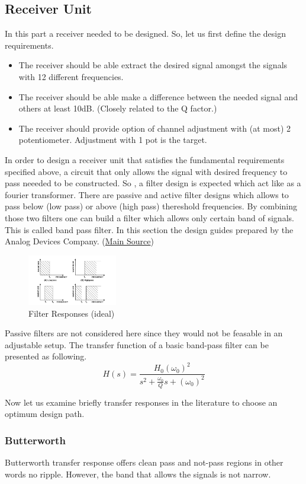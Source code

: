 \documentclass[letterpaper,12pt]{article}
\begin{document}
\subsection{Receiver Unit}
In this part a receiver needed to be designed. So, let us first define the design requirements.
\begin{itemize}
    \item The receiver should be able extract the desired signal amongst the signals with 12 different frequencies.
    \item The receiver should be able make a difference between the needed signal and others at least 10dB. (Closely related to the Q factor.)
    \item The receiver should provide option of channel adjustment with (at most) 2 potentiometer. Adjustment with 1 pot is the target. 
\end{itemize}
In order to design a receiver unit that satisfies the fundamental requirements specified above, a circuit that only allows the signal with desired frequency to pass neeeded to be constructed. So , a filter design is expected which act like as a fourier transformer. There are passive and active filter designs which allows to pass below (low pass) or above (high pass) thereshold frequencies. By combining those two filters one can build a filter which allows only certain band of signals. This is called band pass filter. In this  section the design guides prepared by the Analog Devices Company. (\href{https://www.analog.com/media/en/training-seminars/design-handbooks/basic-linear-design/chapter8.pdf}{Main Source})
\begin{figure}[H]
    \centering
    \includegraphics[width = 0.35\textwidth]{bandpass.png}
    \caption{Filter Responses (ideal)}
\end{figure} 
Passive filters are not considered here since they would not be feasable in an adjustable setup. The transfer function of a basic band-pass filter can be presented as following. 
\[
H(s) = \frac{H_0 (\omega_0)^2}{s^2 + \frac{\omega_0}{Q} s  + (\omega_0)^2}    
\]

Now let us examine briefly transfer responses in the literature to choose an optimum design path.
\subsubsection{Butterworth}
Butterworth transfer response offers clean pass and not-pass regions in other words no ripple. However, the band that allows the signals is not narrow.
\end{document}
